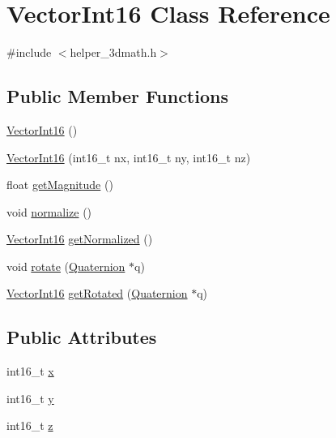\hypertarget{classVectorInt16}{}\section{Vector\+Int16 Class Reference}
\label{classVectorInt16}


{\ttfamily \#include $<$helper\+\_\+3dmath.\+h$>$}

\subsection*{Public Member Functions}
\begin{DoxyCompactItemize}
\item 
\hyperlink{classVectorInt16_a314bffb747999af26026f734c43d61a2}{Vector\+Int16} ()
\item 
\hyperlink{classVectorInt16_acce45f37b3f90df1d5aff6edbf12f02b}{Vector\+Int16} (int16\+\_\+t nx, int16\+\_\+t ny, int16\+\_\+t nz)
\item 
float \hyperlink{classVectorInt16_aeb8087ac5732450bc18ac944a16d0694}{get\+Magnitude} ()
\item 
void \hyperlink{classVectorInt16_aefdadb30fbc20b564bbbf0b1a885e349}{normalize} ()
\item 
\hyperlink{classVectorInt16}{Vector\+Int16} \hyperlink{classVectorInt16_a1f2c17ac660f1e90a095f9e7914200c5}{get\+Normalized} ()
\item 
void \hyperlink{classVectorInt16_ac7bf149db0a2b66d7683b87ebeb2dfc5}{rotate} (\hyperlink{classQuaternion}{Quaternion} $\ast$q)
\item 
\hyperlink{classVectorInt16}{Vector\+Int16} \hyperlink{classVectorInt16_a9e1d9f4553b069bf353e807f130a285b}{get\+Rotated} (\hyperlink{classQuaternion}{Quaternion} $\ast$q)
\end{DoxyCompactItemize}
\subsection*{Public Attributes}
\begin{DoxyCompactItemize}
\item 
int16\+\_\+t \hyperlink{classVectorInt16_a648435b4c99e9da9c95549ac344beaec}{x}
\item 
int16\+\_\+t \hyperlink{classVectorInt16_a5d340e1f1bcbc064e5084ca609a6a6a3}{y}
\item 
int16\+\_\+t \hyperlink{classVectorInt16_af1b5c4c297bdd32751ab4519480b919f}{z}
\end{DoxyCompactItemize}


